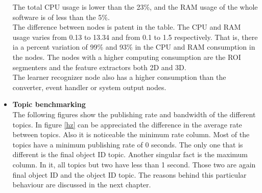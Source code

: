 \begin{itemize}
\begin{table}[H]
\end{table}




			The total CPU usage is lower than the 23\%, and the RAM usage of the whole software is of less than the 5\%. 
			\\


			The difference between nodes is patent in the table.
			The CPU and RAM usage varies from  0.13 to 13.34 and from 0.1 to 1.5 respectively. 
			That is, there ia a percent variation of 99\% and  93\%  in the CPU and RAM consumption in the nodes. 
			The nodes with a higher computing consumption are the ROI segmenters and the feature extractors both 2D and 3D.
			\\

			The learner recognizer node also has a higher consumption than the converter, event handler or system output nodes. 
			

		\item{\textbf{Topic benchmarking}}\\

			The following figures show the publishing rate and bandwidth of the different topics. 
			In figure \ref{hz} can be appreciated the difference in the average rate between topics. 
			Also it is noticeable the minimum rate column. 
			Most of the topics have a minimum publishing rate of 0 seconds.
			The only one that is different is the final object ID topic. 
			Another singular fact is the maximum column. 
			In it, all topics but two have less than 1 second. 
			Those two are again final object ID and the object ID topic. 
			The reasons behind this particular behaviour are discussed in the next chapter. 



\end{itemize}
